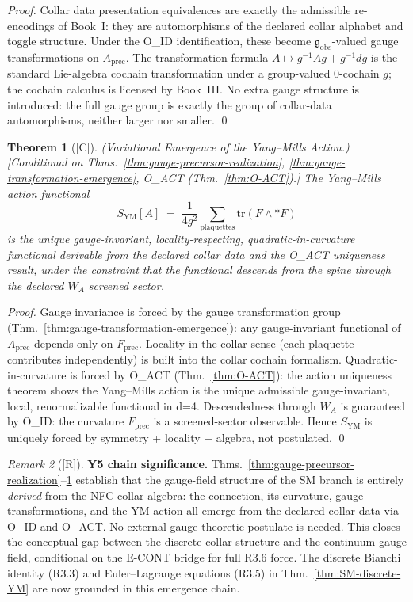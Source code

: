 \documentclass[12pt,oneside]{amsbook}
\theoremstyle{plain}
\newtheorem{theorem}{Theorem}[section]
\theoremstyle{definition}
\theoremstyle{remark}
\newtheorem{remark}[theorem]{Remark}
\newcommand{\status}[1]{\textup{[#1]}}
\begin{document}
\begin{proof}
Collar data presentation equivalences are exactly the admissible
re-encodings of Book~I: they are automorphisms of the declared
collar alphabet and toggle structure. Under the O\_ID
identification, these become $\mathfrak{g}_{\mathrm{obs}}$-valued
gauge transformations on $A_{\mathrm{prec}}$. The transformation
formula $A \mapsto g^{-1}Ag + g^{-1}dg$ is the standard Lie-algebra
cochain transformation under a group-valued 0-cochain $g$; the
cochain calculus is licensed by Book~III. No extra gauge structure
is introduced: the full gauge group is exactly the group of
collar-data automorphisms, neither larger nor smaller. \qed
\end{proof}

\begin{theorem}[\status{C}]\label{thm:variational-emergence}
\textup{(Variational Emergence of the Yang--Mills Action.)}
\textup{[Conditional on Thms.~\ref{thm:gauge-precursor-realization},
\ref{thm:gauge-transformation-emergence}, O\_ACT
(Thm.~\ref{thm:O-ACT}).]}
The Yang--Mills action functional
\[
 S_{\mathrm{YM}}[A] \;=\;
 \frac{1}{4g^2}\sum_{\text{plaquettes}}
 \mathrm{tr}(F \wedge {*}F)
\]
is the unique gauge-invariant, locality-respecting, quadratic-in-curvature
functional derivable from the declared collar data and the O\_ACT
uniqueness result, under the constraint that the functional
descends from the spine through the declared $W_A$ screened sector.
\end{theorem}

\begin{proof}
Gauge invariance is forced by the gauge transformation group
(Thm.~\ref{thm:gauge-transformation-emergence}): any gauge-invariant
functional of $A_{\mathrm{prec}}$ depends only on $F_{\mathrm{prec}}$.
Locality in the collar sense (each plaquette contributes
independently) is built into the collar cochain formalism.
Quadratic-in-curvature is forced by O\_ACT (Thm.~\ref{thm:O-ACT}):
the action uniqueness theorem shows the Yang--Mills action is the
unique admissible gauge-invariant, local, renormalizable functional
in d=4. Descendedness through $W_A$ is guaranteed by O\_ID:
the curvature $F_{\mathrm{prec}}$ is a screened-sector observable.
Hence $S_{\mathrm{YM}}$ is uniquely forced by symmetry + locality +
algebra, not postulated. \qed
\end{proof}

\begin{remark}[\status{R}]\label{rem:y5-status}
\textbf{Y5 chain significance.}
Thms.~\ref{thm:gauge-precursor-realization}--\ref{thm:variational-emergence}
establish that the gauge-field structure of the SM branch is
entirely \emph{derived} from the NFC collar-algebra: the connection,
its curvature, gauge transformations, and the YM action all emerge
from the declared collar data via O\_ID and O\_ACT. No external
gauge-theoretic postulate is needed. This closes the conceptual gap
between the discrete collar structure and the continuum gauge field,
conditional on the E-CONT bridge for full R3.6 force. The discrete
Bianchi identity (R3.3) and Euler--Lagrange equations (R3.5) in
Thm.~\ref{thm:SM-discrete-YM} are now grounded in this emergence
chain.
\end{remark}
\end{document}

